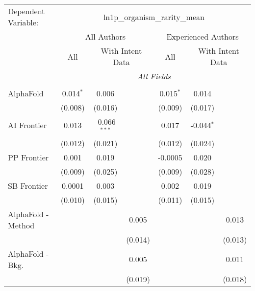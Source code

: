 \begingroup
\centering
\begin{tabular}{lcccccc}
   \tabularnewline \midrule \midrule
   Dependent Variable: & \multicolumn{6}{c}{ln1p\_organism\_rarity\_mean}\\
 & \multicolumn{3}{c}{All Authors} & \multicolumn{3}{c}{Experienced Authors} \\
\cmidrule(lr){2-4} \cmidrule(lr){5-7}
 & \multicolumn{1}{c}{All} & \multicolumn{2}{c}{With Intent Data} & \multicolumn{1}{c}{All} & \multicolumn{2}{c}{With Intent Data} \\
\cmidrule(lr){2-2} \cmidrule(lr){3-4} \cmidrule(lr){5-5} \cmidrule(lr){6-7}
 & \multicolumn{6}{c}{\textit{All Fields}} \\ \\
   AlphaFold                     & 0.014$^{*}$ & 0.006          &         & 0.015$^{*}$ & 0.014        &   \\   
                                 & (0.008)     & (0.016)        &         & (0.009)     & (0.017)      &   \\   
   AI Frontier                   & 0.013       & -0.066$^{***}$ &         & 0.017       & -0.044$^{*}$ &   \\   
                                 & (0.012)     & (0.021)        &         & (0.012)     & (0.024)      &   \\   
   PP Frontier                   & 0.001       & 0.019          &         & -0.0005     & 0.020        &   \\   
                                 & (0.009)     & (0.025)        &         & (0.009)     & (0.028)      &   \\   
   SB Frontier                   & 0.0001      & 0.003          &         & 0.002       & 0.019        &   \\   
                                 & (0.010)     & (0.015)        &         & (0.011)     & (0.015)      &   \\   
   AlphaFold - Method            &             &                & 0.005   &             &              & 0.013\\   
                                 &             &                & (0.014) &             &              & (0.013)\\   
   AlphaFold - Bkg.              &             &                & 0.005   &             &              & 0.011\\   
                                 &             &                & (0.019) &             &              & (0.018)\\   

\end{tabular}
